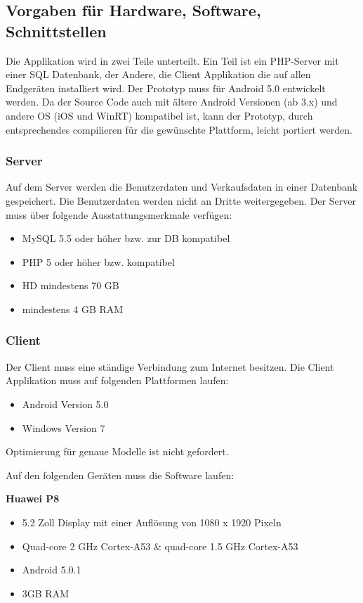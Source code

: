 \documentclass[a4paper,12pt,oneside]{scrartcl}
\begin{document}
\subsection{Vorgaben für Hardware, Software, Schnittstellen}
Die Applikation wird in zwei Teile unterteilt.
Ein Teil ist ein PHP-Server mit einer SQL Datenbank, der Andere, die Client Applikation die auf allen Endgeräten installiert wird.
Der Prototyp muss für Android 5.0 entwickelt werden. 
Da der Source Code auch mit ältere Android Versionen (ab 3.x) und andere OS (iOS und WinRT) kompatibel ist, kann der Prototyp, durch entsprechendes compilieren für die gewünschte Plattform, leicht portiert werden.

\subsubsection*{Server}
Auf dem Server werden die Benutzerdaten und Verkaufsdaten in einer Datenbank gespeichert.
Die Benutzerdaten werden nicht an Dritte weitergegeben.
Der Server muss über folgende Ausstattungsmerkmale verfügen:
\begin{itemize}
	\item MySQL 5.5 oder höher bzw. zur DB kompatibel
	\item PHP 5 oder höher bzw. kompatibel
	\item HD mindestens 70 GB
	\item mindestens 4 GB RAM
\end{itemize}

\subsubsection*{Client}
Der Client muss eine ständige Verbindung zum Internet besitzen.
Die Client Applikation muss auf folgenden Plattformen laufen: 
\begin{itemize}
	\item Android Version 5.0
	\item Windows Version 7
\end{itemize} 
Optimierung für genaue Modelle ist nicht gefordert.

Auf den folgenden Geräten muss die Software laufen:

\textbf{Huawei P8}
\begin{itemize}
	\item 5.2 Zoll Display mit einer Auflösung von 1080 x 1920 Pixeln
	\item Quad-core 2 GHz Cortex-A53 \& quad-core 1.5 GHz Cortex-A53
	\item Android 5.0.1
	\item 3GB RAM
\end{itemize} 
\end{document}
